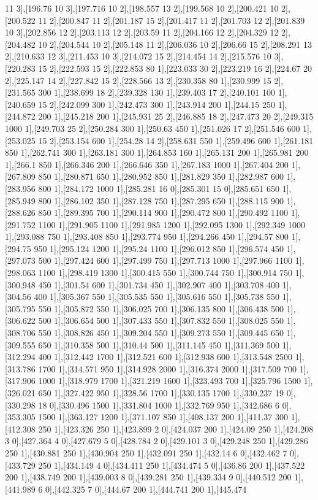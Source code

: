 {11 3],[196.76 10 3],[197.716 10 2],[198.557 13 2],[199.568 10 2],[200.421 10 2],[200.522 11 2],[200.847 11 2],[201.187 15 2],[201.417 11 2],[201.703 12 2],[201.839 10 3],[202.856 12 2],[203.113 12 2],[203.59 11 2],[204.166 12 2],[204.329 12 2],[204.482 10 2],[204.544 10 2],[205.148 11 2],[206.036 10 2],[206.66 15 2],[208.291 13 2],[210.633 12 3],[211.453 10 3],[214.072 15 2],[214.454 14 2],[215.576 10 3],[220.283 15 2],[222.593 15 2],[222.853 80 1],[223.033 30 2],[223.219 16 2],[224.67 20 2],[225.147 14 2],[227.842 15 2],[228.566 13 2],[230.358 80 1],[230.999 15 2],[231.565 300 1],[238.699 18 2],[239.328 130 1],[239.403 17 2],[240.101 100 1],[240.659 15 2],[242.099 300 1],[242.473 300 1],[243.914 200 1],[244.15 250 1],[244.872 200 1],[245.218 200 1],[245.931 25 2],[246.885 18 2],[247.473 20 2],[249.315 1000 1],[249.703 25 2],[250.284 300 1],[250.63 450 1],[251.026 17 2],[251.546 600 1],[253.025 15 2],[253.154 600 1],[254.28 14 2],[258.631 550 1],[259.496 600 1],[261.181 850 1],[262.741 300 1],[263.181 300 1],[264.853 160 1],[265.131 200 1],[265.981 200 1],[266.1 850 1],[266.346 200 1],[266.646 350 1],[267.183 1000 1],[267.404 200 1],[267.809 850 1],[280.871 650 1],[280.952 850 1],[281.829 350 1],[282.987 600 1],[283.956 800 1],[284.172 1000 1],[285.281 16 0],[285.301 15 0],[285.651 650 1],[285.949 800 1],[286.102 350 1],[287.128 750 1],[287.295 650 1],[288.115 900 1],[288.626 850 1],[289.395 700 1],[290.114 900 1],[290.472 800 1],[290.492 1100 1],[291.752 1100 1],[291.905 1100 1],[291.985 1200 1],[292.095 1300 1],[292.349 1000 1],[293.088 750 1],[293.408 850 1],[293.774 950 1],[294.266 450 1],[294.57 800 1],[294.75 950 1],[295.124 1200 1],[295.24 1100 1],[296.012 850 1],[296.574 450 1],[297.073 500 1],[297.424 600 1],[297.499 750 1],[297.713 1000 1],[297.966 1100 1],[298.063 1100 1],[298.419 1300 1],[300.415 550 1],[300.744 750 1],[300.914 750 1],[300.948 450 1],[301.54 600 1],[301.734 450 1],[302.907 400 1],[303.708 400 1],[304.56 400 1],[305.367 550 1],[305.535 550 1],[305.616 550 1],[305.738 550 1],[305.795 550 1],[305.872 550 1],[306.025 700 1],[306.135 800 1],[306.438 500 1],[306.622 500 1],[306.654 500 1],[307.433 550 1],[307.832 550 1],[308.025 550 1],[308.706 550 1],[308.826 450 1],[309.204 550 1],[309.273 550 1],[309.445 650 1],[309.555 650 1],[310.358 500 1],[310.44 500 1],[311.145 450 1],[311.369 500 1],[312.294 400 1],[312.442 1700 1],[312.521 600 1],[312.938 600 1],[313.548 2500 1],[313.786 1700 1],[314.571 950 1],[314.928 2000 1],[316.374 2000 1],[317.509 700 1],[317.906 1000 1],[318.979 1700 1],[321.219 1600 1],[323.493 700 1],[325.796 1500 1],[326.021 650 1],[327.422 950 1],[328.56 1700 1],[330.135 1700 1],[330.237 19 0],[330.298 18 0],[330.496 1500 1],[331.804 1000 1],[332.769 950 1],[342.686 6 0],[353.305 1500 1],[363.127 1200 1],[371.107 850 1],[408.137 200 1],[411.37 300 1],[412.308 250 1],[423.326 250 1],[423.899 2 0],[424.037 200 1],[424.09 250 1],[424.208 3 0],[427.364 4 0],[427.679 5 0],[428.784 2 0],[429.101 3 0],[429.248 250 1],[429.286 250 1],[430.881 250 1],[430.904 250 1],[432.091 250 1],[432.14 6 0],[432.462 7 0],[433.729 250 1],[434.149 4 0],[434.411 250 1],[434.474 5 0],[436.86 200 1],[437.522 200 1],[438.749 200 1],[439.003 8 0],[439.281 250 1],[439.334 9 0],[440.512 200 1],[441.989 6 0],[442.325 7 0],[444.67 200 1],[444.741 200 1],[445.474 }
